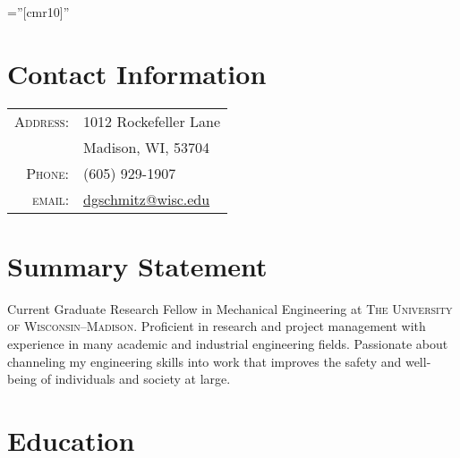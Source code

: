 \documentclass[a4paper,10pt]{article} %
\begin{document}
\pagestyle{empty} %

\font\fb=''[cmr10]'' %


\par{\bigskip\par} %

\section{Contact Information}

\begin{tabular}{rl}
\textsc{Address:} & 1012 Rockefeller Lane \\
& Madison, WI, 53704 \\
\textsc{Phone:} & (605) 929-1907\\
\textsc{email:} & \href{mailto:dgschmitz@wisc.edu}{dgschmitz@wisc.edu}
\end{tabular}


\section{Summary Statement}
Current Graduate Research Fellow in Mechanical Engineering at \textsc{The University of Wisconsin--Madison}. Proficient in research and project management with experience in many academic and industrial engineering fields. Passionate about channeling my engineering skills into work that improves the safety and well-being of individuals and society at large.


\section{Education}
\end{document}
